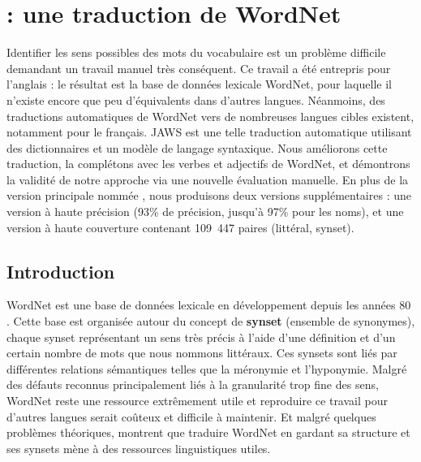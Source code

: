 \chapter{\newjaws{} : une traduction de WordNet}
\label{ch:wonef} 

Identifier les sens possibles des mots du vocabulaire est un problème difficile demandant un travail manuel très conséquent. Ce travail a été entrepris pour l'anglais : le résultat est la base de données lexicale WordNet, pour laquelle il n'existe encore que peu d'équivalents dans d'autres langues. Néanmoins, des traductions automatiques de WordNet vers de nombreuses langues cibles existent, notamment pour le français. JAWS est une telle traduction automatique utilisant des dictionnaires et un modèle de langage syntaxique. Nous améliorons cette traduction, la complétons avec les verbes et adjectifs de WordNet, et démontrons la validité de notre approche via une nouvelle évaluation manuelle. En plus de la version principale nommée \newjaws{}, nous produisons deux versions supplémentaires : une version à haute précision (93\% de précision, jusqu'à 97\% pour les noms), et une version à haute couverture contenant 109~447 paires (littéral, synset).


\section{Introduction}
\label{sec:intro}

WordNet est une base de données lexicale en développement depuis les années 80 \citep{Fellbaum1998}. Cette base est organisée autour du concept de \textbf{synset} (ensemble de synonymes), chaque synset représentant un sens très précis à l'aide d'une définition et d'un certain nombre de mots que nous nommons littéraux. Ces synsets sont liés par différentes relations sémantiques telles que la méronymie et l'hyponymie. Malgré des défauts reconnus \citep{Boyd-graber06addingdense} principalement liés à la granularité trop fine des sens, WordNet reste une ressource extrêmement utile et reproduire ce travail pour d'autres langues serait coûteux et difficile à maintenir. Et malgré quelques problèmes théoriques, \cite{fellbaum2007connecting,demelo2008utility} montrent que traduire WordNet en gardant sa structure et ses synsets mène à des ressources linguistiques utiles.

